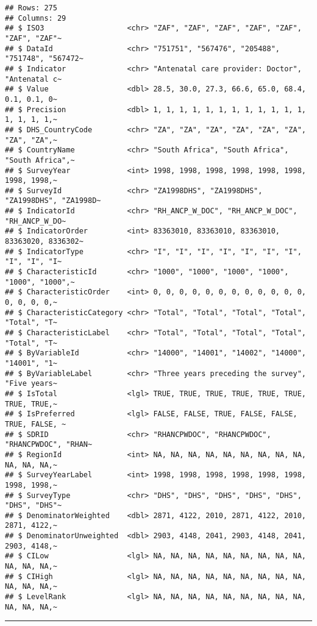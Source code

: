 \documentclass[
]{article}
\begin{document}
\begin{verbatim}
## Rows: 275
## Columns: 29
## $ ISO3                   <chr> "ZAF", "ZAF", "ZAF", "ZAF", "ZAF", "ZAF", "ZAF"~
## $ DataId                 <chr> "751751", "567476", "205488", "751748", "567472~
## $ Indicator              <chr> "Antenatal care provider: Doctor", "Antenatal c~
## $ Value                  <dbl> 28.5, 30.0, 27.3, 66.6, 65.0, 68.4, 0.1, 0.1, 0~
## $ Precision              <dbl> 1, 1, 1, 1, 1, 1, 1, 1, 1, 1, 1, 1, 1, 1, 1, 1,~
## $ DHS_CountryCode        <chr> "ZA", "ZA", "ZA", "ZA", "ZA", "ZA", "ZA", "ZA",~
## $ CountryName            <chr> "South Africa", "South Africa", "South Africa",~
## $ SurveyYear             <int> 1998, 1998, 1998, 1998, 1998, 1998, 1998, 1998,~
## $ SurveyId               <chr> "ZA1998DHS", "ZA1998DHS", "ZA1998DHS", "ZA1998D~
## $ IndicatorId            <chr> "RH_ANCP_W_DOC", "RH_ANCP_W_DOC", "RH_ANCP_W_DO~
## $ IndicatorOrder         <int> 83363010, 83363010, 83363010, 83363020, 8336302~
## $ IndicatorType          <chr> "I", "I", "I", "I", "I", "I", "I", "I", "I", "I~
## $ CharacteristicId       <chr> "1000", "1000", "1000", "1000", "1000", "1000",~
## $ CharacteristicOrder    <int> 0, 0, 0, 0, 0, 0, 0, 0, 0, 0, 0, 0, 0, 0, 0, 0,~
## $ CharacteristicCategory <chr> "Total", "Total", "Total", "Total", "Total", "T~
## $ CharacteristicLabel    <chr> "Total", "Total", "Total", "Total", "Total", "T~
## $ ByVariableId           <chr> "14000", "14001", "14002", "14000", "14001", "1~
## $ ByVariableLabel        <chr> "Three years preceding the survey", "Five years~
## $ IsTotal                <lgl> TRUE, TRUE, TRUE, TRUE, TRUE, TRUE, TRUE, TRUE,~
## $ IsPreferred            <lgl> FALSE, FALSE, TRUE, FALSE, FALSE, TRUE, FALSE, ~
## $ SDRID                  <chr> "RHANCPWDOC", "RHANCPWDOC", "RHANCPWDOC", "RHAN~
## $ RegionId               <int> NA, NA, NA, NA, NA, NA, NA, NA, NA, NA, NA, NA,~
## $ SurveyYearLabel        <int> 1998, 1998, 1998, 1998, 1998, 1998, 1998, 1998,~
## $ SurveyType             <chr> "DHS", "DHS", "DHS", "DHS", "DHS", "DHS", "DHS"~
## $ DenominatorWeighted    <dbl> 2871, 4122, 2010, 2871, 4122, 2010, 2871, 4122,~
## $ DenominatorUnweighted  <dbl> 2903, 4148, 2041, 2903, 4148, 2041, 2903, 4148,~
## $ CILow                  <lgl> NA, NA, NA, NA, NA, NA, NA, NA, NA, NA, NA, NA,~
## $ CIHigh                 <lgl> NA, NA, NA, NA, NA, NA, NA, NA, NA, NA, NA, NA,~
## $ LevelRank              <lgl> NA, NA, NA, NA, NA, NA, NA, NA, NA, NA, NA, NA,~
\end{verbatim}

\begin{center}\rule{0.5\linewidth}{0.5pt}\end{center}
\end{document}
